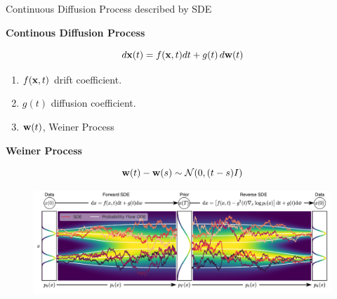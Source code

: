 \documentclass[aspectratio=169, 10pt]{beamer}
\theoremstyle{definition}
\begin{document}
\begin{frame}{Continuous Diffusion Process described by SDE}
  \begin{minipage}[t]{0.5\textwidth}
    \begin{center}
      \bf
      Continous Diffusion Process
    \end{center}
    \[
      d{\mathbf{x}}(t) = f({\mathbf{x}},t) dt + g(t)\,d{\mathbf{w}}(t)
    \]
    \begin{enumerate}
      \item $f({\mathbf{x}},t)$ drift coefficient.
      \item $g(t)$ diffusion coefficient.
      \item ${\mathbf{w}}(t)$, Weiner Process
    \end{enumerate}

    \begin{center}
      \bf
      Weiner Process
    \end{center}
      \[
        {\mathbf{w}}(t)-{\mathbf{w}}(s) \sim \mathcal{N}(0,(t-s)I)
      \]
  \end{minipage}\hfill
  \begin{minipage}[t]{0.5\textwidth}
  \begin{figure}[h!]
    \centering
    \includegraphics[clip, width=\textwidth,trim = 0 0 26.75cm 0]{./pic/sde_overview.png}
  \end{figure}
  \end{minipage}
  \pause
\end{frame}
\end{document}
